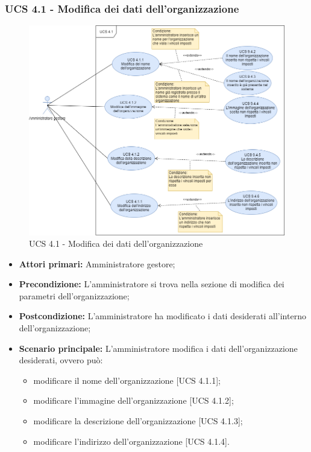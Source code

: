 \subsubsection{UCS 4.1 - Modifica dei dati dell'organizzazione}%
\begin{figure}[h]
	\centering
    \includegraphics[scale=0.53]{sezioni/UseCase/Immagini/UCS4.1.png}
    \caption{UCS 4.1 - Modifica dei dati dell'organizzazione}
\end{figure}
\begin{itemize}
    \item \textbf{Attori primari:} Amministratore gestore;
    \item \textbf{Precondizione:} L'amministratore si trova nella sezione di modifica dei parametri dell'organizzazione;
    \item \textbf{Postcondizione:} L'amministratore ha modificato i dati desiderati all'interno dell’organizzazione;
    \item \textbf{Scenario principale:} L'amministratore modifica i dati dell'organizzazione desiderati, ovvero può:
    \begin{itemize}
        \item modificare il nome dell'organizzazione [UCS 4.1.1];
        \item modificare l'immagine dell'organizzazione [UCS 4.1.2];
        \item modificare la descrizione dell'organizzazione [UCS 4.1.3];
        \item modificare l'indirizzo dell'organizzazione [UCS 4.1.4].
    \end{itemize}
\end{itemize}


